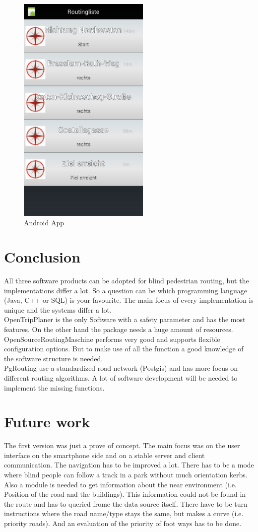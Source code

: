 \documentclass{sig-alternate}
\begin{document}
\begin{figure}
\centering
\includegraphics[width=2.5in]{App2.png}
\caption{Android App}
\label{fig:app}
\end{figure}


\section{Conclusion}

All three software products can be adopted for blind pedestrian routing, but the implementations differ a lot. So a question can be which programming language (Java, C++ or SQL) is your favourite. The main focus of every implementation is unique and the systems differ a lot. \\ 
OpenTripPlaner is the only Software with a safety parameter and has the most features. On the other hand the package needs a huge amount of resources. \\
 OpenSourceRoutingMaschine performs very good and supports flexible configuration options. But to make use of all the function a good knowledge of the software structure is needed. \\
 PgRouting use a standardized road network (Postgis) and has more focus on different routing algorithms. A lot of software development will be needed to implement the missing functions.


\section{Future work}
The first version was just a prove of concept. The main focus was on the user interface on the smartphone side and on a stable server and client communication. The navigation has to be improved a lot. There has to be a mode where blind people can follow a track in a park without much orientation kerbs. Also a module is needed to get information about the near environment (i.e. Position of the road and the buildings). This information could not be found in the route and has to queried frome the data source itself. There have to be turn instructions where the road name/type stays the same, but makes a curve (i.e. priority roads). And an evaluation of the priority of foot ways has to be done. 
\end{document}
